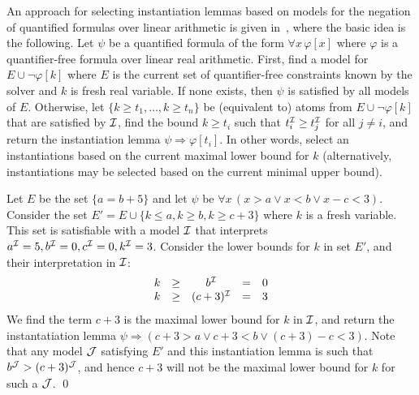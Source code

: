 \documentclass[oribibl]{llncs}
\begin{document}
An approach for selecting instantiation lemmas based on models for the negation of quantified formulas
over linear arithmetic is given in~\cite{InstLA2016}, where the basic idea is the following.
Let $\psi$ be a quantified formula of the form $\forall x\, \varphi[ x ]$ where $\varphi$ is a quantifier-free formula over linear real arithmetic.
First, find a model for $E \cup \neg \varphi[ k ]$ where $E$ is the current set of quantifier-free constraints known by the solver and $k$ is fresh real variable.
If none exists, then $\psi$ is satisfied by all models of $E$.
Otherwise, let $\{ k \geq t_1, \ldots, k \geq t_n \}$ be (equivalent to) atoms from $E \cup \neg \varphi[ k ]$ that are satisfied by $\mathcal{I}$,
find the bound $k \geq t_i$ such that $t_i^{\mathcal{I}} \geq t_j^{\mathcal{I}}$ for all $j \neq i$,
and return the instantiation lemma $\psi \Rightarrow \varphi[ t_i ]$.
In other words, select an instantiations based on the current maximal lower bound for $k$ (alternatively, instantiations may be selected based on the current minimal upper bound).

\begin{example}
\label{ex:cegqi}
Let $E$ be the set $\{ a=b+5 \}$ and let $\psi$ be $\forall x\, (x>a \vee x<b \vee x-c<3)$.
Consider the set $E' = E \cup \{ k \leq a, k \geq b, k \geq c+3 \}$ where $k$ is a fresh variable.
This set is satisfiable with a model $\mathcal{I}$ that interprets $a^{\mathcal{I}} = 5, b^{\mathcal{I}} = 0, c^{\mathcal{I}} = 0, k^{\mathcal{I}} = 3$.
Consider the lower bounds for $k$ in set $E'$, and their interpretation in $\mathcal{I}$:
\[
\begin{array}{ccccc}
k & \geq & b^{\mathcal{I}} & = & 0 \\
k & \geq & (c+3)^{\mathcal{I}} & = & 3 \\
\end{array}
\]
We find the term $c+3$ is the maximal lower bound for $k$ in $\mathcal{I}$,
and return the instantatiation lemma $\psi \Rightarrow ( c+3>a \vee c+3<b \vee (c+3)-c<3 )$.
Note that any model $\mathcal{J}$ satisfying $E'$ and this instantiation lemma is such that $b^{\mathcal{J}} > (c+3)^{\mathcal{J}}$,
and hence $c+3$ will not be the maximal lower bound for $k$ for such a $\mathcal{J}$.
\qed
\end{example}
\end{document}
